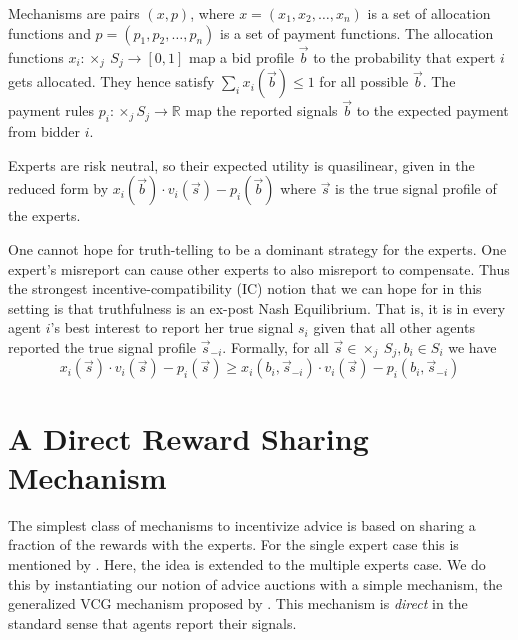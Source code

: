 Mechanisms are pairs $(x,p)$, where $x=(x_1,x_2,\ldots,x_n)$ is a set of allocation functions and $p=(p_1,p_2,\ldots,p_n)$ is a set of payment functions.
The allocation functions $x_i:\times_j \ S_j\rightarrow [0,1]$ map a bid profile $\vec{b}$ to the probability that expert $i$ gets allocated. They hence satisfy $\sum_i x_i(\vec{b}) \leq 1$ for all possible $\vec{b}$.
The payment rules $p_i: \times _j S_j \rightarrow \mathbb R$ map the reported signals $\vec{b}$ to the expected payment from bidder $i$.

Experts are risk neutral, so their expected utility is quasilinear, given in the reduced form by $x_i (\vec{b}) \cdot v_i(\vec{s}) - p_i(\vec{b})$ where $\vec{s}$ is the true signal profile of the experts.


One cannot hope for truth-telling to be a dominant strategy for the experts. One expert's misreport can cause other experts to also misreport to compensate. Thus the strongest incentive-compatibility (IC) notion that we can hope for in this setting is that truthfulness is an ex-post Nash Equilibrium. That is, it is in every agent $i$'s best interest to report her true signal $s_i$ given that all other agents reported the true signal profile $\vec{s}_{-i}$. Formally, for all $\vec{s} \in \times _{j} \  S_j, b_i \in S_i$ we have
$$x_i(\vec{s}) \cdot v_i(\vec{s}) - p_i(\vec{s}) \geq x_i(b_i, \vec{s}_{-i}) \cdot v_i(\vec{s}) - p_i(b_i, \vec{s}_{-i})$$





\section{A Direct Reward Sharing Mechanism}

The simplest class of mechanisms to incentivize advice is based on sharing a fraction of the rewards with the experts. For the single expert case this is mentioned by \citep{othman2010decision}. Here, the idea is extended to the multiple experts case. We do this by instantiating our notion of advice auctions with a simple mechanism,
the generalized VCG mechanism proposed by \citep{maskin1992auctions}. This mechanism is \emph{direct} in the standard sense that agents report their signals. 

